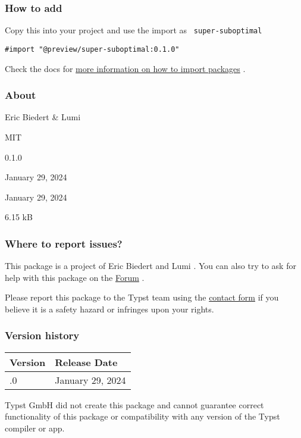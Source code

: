 \subsubsection{How to add}\label{how-to-add}

Copy this into your project and use the import as
\texttt{\ super-suboptimal\ }

\begin{verbatim}
#import "@preview/super-suboptimal:0.1.0"
\end{verbatim}



Check the docs for
\href{https://typst.app/docs/reference/scripting/\#packages}{more
information on how to import packages} .

\subsubsection{About}\label{about}

\begin{description}
\tightlist
\item[Author s :]
Eric Biedert \& Lumi
\item[License:]
MIT
\item[Current version:]
0.1.0
\item[Last updated:]
January 29, 2024
\item[First released:]
January 29, 2024
\item[Archive size:]
6.15 kB
\href{https://packages.typst.org/preview/super-suboptimal-0.1.0.tar.gz}{\pandocbounded{}}
\end{description}

\subsubsection{Where to report issues?}\label{where-to-report-issues}

This package is a project of Eric Biedert and Lumi . You can also try to
ask for help with this package on the
\href{https://forum.typst.app}{Forum} .

Please report this package to the Typst team using the
\href{https://typst.app/contact}{contact form} if you believe it is a
safety hazard or infringes upon your rights.

\label{versions}
\subsubsection{Version history}\label{version-history}

\begin{longtable}[]{@{}ll@{}}
\toprule\noalign{}
Version & Release Date \\
\midrule\noalign{}
\endhead
\bottomrule\noalign{}
\endlastfoot
0.1.0 & January 29, 2024 \\
\end{longtable}

Typst GmbH did not create this package and cannot guarantee correct
functionality of this package or compatibility with any version of the
Typst compiler or app.
